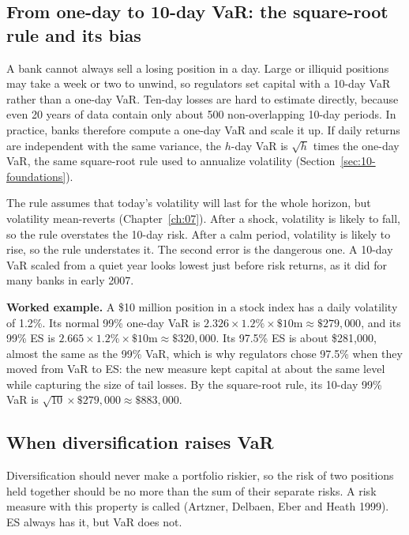 \subsection{From one-day to 10-day VaR: the square-root rule and its bias}


A bank cannot always sell a losing position in a day. Large or illiquid positions may take a week or two to unwind, so regulators set capital with a 10-day VaR rather than a one-day VaR. Ten-day losses are hard to estimate directly, because even 20 years of data contain only about 500 non-overlapping 10-day periods. In practice, banks therefore compute a one-day VaR and scale it up. If daily returns are independent with the same variance, the $h$-day VaR is $\sqrt{h}$ times the one-day VaR, the same square-root rule used to annualize volatility (Section~\ref{sec:10-foundations}).

The rule assumes that today's volatility will last for the whole horizon, but volatility mean-reverts (Chapter~\ref{ch:07}). After a shock, volatility is likely to fall, so the rule overstates the 10-day risk. After a calm period, volatility is likely to rise, so the rule understates it. The second error is the dangerous one. A 10-day VaR scaled from a quiet year looks lowest just before risk returns, as it did for many banks in early 2007.

\textbf{Worked example.} A \$10 million position in a stock index has a daily volatility of 1.2\%. Its normal 99\% one-day VaR is $2.326 \times 1.2\% \times \$10\text{m} \approx \$279{,}000$, and its 99\% ES is $2.665 \times 1.2\% \times \$10\text{m} \approx \$320{,}000$. Its 97.5\% ES is about \$281{,}000, almost the same as the 99\% VaR, which is why regulators chose 97.5\% when they moved from VaR to ES: the new measure kept capital at about the same level while capturing the size of tail losses. By the square-root rule, its 10-day 99\% VaR is $\sqrt{10} \times \$279{,}000 \approx \$883{,}000$.

\subsection{When diversification raises VaR}

Diversification should never make a portfolio riskier, so the risk of two positions held together should be no more than the sum of their separate risks. A risk measure with this property is called  (Artzner, Delbaen, Eber and Heath 1999). ES always has it, but VaR does not.

